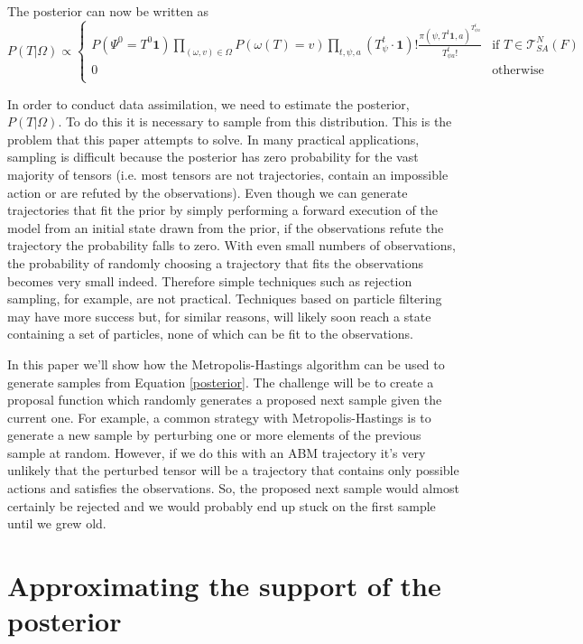 \documentclass{article}
\begin{document}
The posterior can now be written as
\begin{equation}
P(T|\Omega) \propto 
\begin{cases}
P(\Psi^0 = T^0\mathbf{1})
\prod_{(\omega,v) \in \Omega} P\left(\omega(T)=v\right)
\prod_{t, \psi, a}\left(T^t_{\psi}\cdot\mathbf{1}\right)!
\frac{\pi(\psi,T^t\mathbf{1},a)^{T^{t}_{\psi a}}}{T^t_{\psi a}!} & \text{if } T \in \mathcal{T}^N_{SA}(F) \\
0 & \text{otherwise}\\
\end{cases}
\label{posterior}
\end{equation}

In order to conduct data assimilation, we need to estimate the posterior, $P(T|\Omega)$. To do this it is necessary to sample from this distribution. This is the problem that this paper attempts to solve.
In many practical applications, sampling is difficult because the posterior has zero probability for the vast majority of tensors (i.e. most tensors are not trajectories, contain an impossible action or are refuted by the observations). Even though we can generate trajectories that fit the prior by simply performing a forward execution of the model from an initial state drawn from the prior, if the observations refute the trajectory the probability falls to zero. 
With even small numbers of observations, the probability of randomly choosing a trajectory that fits the observations becomes very small indeed. Therefore simple techniques such as rejection sampling, for example, are not practical. Techniques based on particle filtering may have more success but, for similar reasons, will likely soon reach a state containing a set of particles, none of which can be fit to the observations.

In this paper we'll show how the Metropolis-Hastings algorithm can be used to generate samples from Equation \eqref{posterior}. The challenge will be to create a proposal function which randomly generates a proposed next sample given the current one. For example, a common strategy with Metropolis-Hastings is to generate a new sample by perturbing one or more elements of the previous sample at random. However, if we do this with an ABM trajectory it's very unlikely that the perturbed tensor will be a trajectory that contains only possible actions and satisfies the observations. So, the proposed next sample would almost certainly be rejected and we would probably end up stuck on the first sample until we grew old.

\section{Approximating the support of the posterior}
\end{document}
